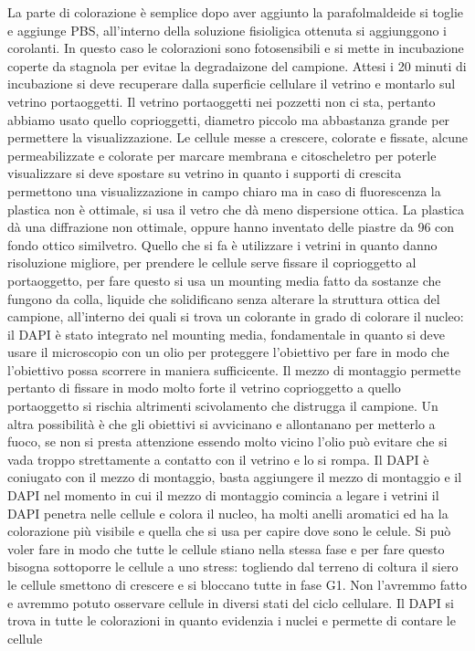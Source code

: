 La parte di colorazione \`e semplice dopo aver aggiunto la parafolmaldeide si toglie e aggiunge PBS, all'interno
della soluzione fisioligica ottenuta si aggiunggono i corolanti. In questo caso le colorazioni sono fotosensibili e si mette in incubazione coperte da stagnola per evitae la degradaizone
del campione. Attesi i 20 minuti di incubazione si deve recuperare dalla superficie cellulare il vetrino e montarlo sul vetrino portaoggetti. Il vetrino portaoggetti nei pozzetti non
ci sta, pertanto abbiamo usato quello coprioggetti, diametro piccolo ma abbastanza grande per permettere la visualizzazione. Le cellule messe a crescere, colorate e fissate, alcune
permeabilizzate e colorate per marcare membrana e citoscheletro per poterle visualizzare si deve spostare su vetrino in quanto i supporti di crescita permettono una visualizzazione in 
campo chiaro ma in caso di fluorescenza la plastica non \`e ottimale, si usa il vetro che d\`a meno dispersione ottica. La plastica d\`a una diffrazione non ottimale, oppure hanno
inventato delle piastre da 96 con fondo ottico similvetro. Quello che si fa \`e utilizzare i vetrini in quanto danno risoluzione migliore, per prendere le cellule serve fissare il
coprioggetto al portaoggetto, per fare questo si usa un mounting media fatto da sostanze che fungono da colla, liquide che solidificano senza alterare la struttura ottica del campione, 
all'interno dei quali si trova un colorante in grado di colorare il nucleo: il DAPI \`e stato integrato nel mounting media, fondamentale in quanto si deve usare il
microscopio con un olio per proteggere l'obiettivo per fare in modo che l'obiettivo possa scorrere in maniera sufficicente. Il mezzo di montaggio permette pertanto di fissare in modo 
molto forte il vetrino coprioggetto a quello portaoggetto si rischia altrimenti scivolamento che distrugga il campione. Un altra possibilit\`a \`e che gli obiettivi si avvicinano e 
allontanano per metterlo a fuoco, se non si presta attenzione essendo molto vicino l'olio pu\`o evitare che si vada troppo strettamente a contatto con il vetrino e lo si rompa. Il DAPI
\`e coniugato con il mezzo di montaggio, basta aggiungere il mezzo di montaggio e il DAPI nel momento in cui il mezzo di montaggio comincia a legare i vetrini il DAPI penetra nelle 
cellule e colora il nucleo, ha molti anelli aromatici ed ha la colorazione pi\`u visibile e quella che si usa per capire dove sono le celule.   Si pu\`o voler fare in modo che tutte le cellule stiano nella stessa fase e per fare questo bisogna sottoporre le cellule a uno stress:
togliendo dal terreno di coltura il siero le cellule smettono di crescere e si bloccano tutte in fase G1. Non l'avremmo fatto e avremmo potuto osservare cellule in diversi stati del 
ciclo cellulare. Il DAPI si trova in tutte le colorazioni in quanto evidenzia i nuclei e permette di contare le cellule

